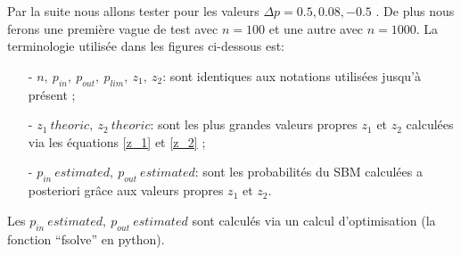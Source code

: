Par la suite nous allons tester pour les valeurs $\Delta p= 0.5, 0.08, -0.5$ .
De plus nous ferons une première vague de test avec $n=100$ et une autre avec $n=1000$.
La terminologie utilisée dans les figures ci-dessous est:
\begin{itemize}
	\item[- \underline{$n,\: p_{in},\: p_{out},\: p_{lim},\: z_1,\: z_2$}:] sont identiques aux notations utilisées jusqu'à présent ;
	\item[- \underline{$z_1\: theoric, \:z_2\: theoric$}:] sont les plus grandes valeurs propres $z_1$ et $z_2$ calculées via les équations \eqref{z_1} et \eqref{z_2} ;    
	\item[- \underline{$p_{in}\: estimated, \:p_{out}\: estimated$}:] sont les probabilités du SBM calculées a posteriori grâce aux valeurs propres $z_1$ et $z_2$.\\
\end{itemize}
Les $p_{in}\: estimated, \:p_{out}\: estimated$ sont calculés via un calcul d'optimisation (la fonction ``fsolve'' en python).

